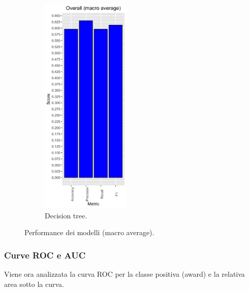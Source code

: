 \begin{figure}[H]
\begin{subfigure}[b]{0.3\textwidth}
		\includegraphics[width=4.25cm]{../images/rpart_performance.png}
		\caption{Decision tree.}
	\end{subfigure}
	\caption{Performance dei modelli (macro average).}
\end{figure}


\subsubsection{Curve ROC e AUC}
Viene ora analizzata la curva ROC per la classe positiva (award) e la relativa area sotto la curva.

